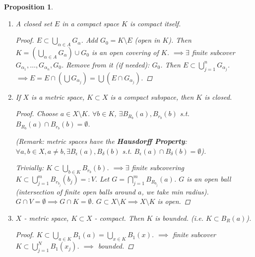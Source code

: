 \documentclass[12pt]{article}
\theoremstyle{blueplain}
\newtheorem{proposition}[theorem]{Proposition}
\theoremstyle{bluedef}
\theoremstyle{blueremark}
\numberwithin{equation}{section}
\begin{document}
      \begin{proposition}
        \begin{enumerate}
          \item A closed set $E$ in a compact space $K$ is compact itself.
                \begin{proof}
                  $E \subset \bigcup_{\alpha \in A} G_\alpha$. Add $G_0 = K \setminus E$ (open in $K$).
                  Then $K = (\bigcup_{\alpha \in A} G_\alpha) \cup G_0$ is an open covering of $K$.
                  $\implies \exists$ finite subcover $G_{\alpha_1}, \ldots, G_{\alpha_n}, G_0$.
                  Remove from it (if needed): $G_0$.
                  Then $E \subset \bigcup_{j=1}^n G_{\alpha_j}$.
                  $\implies E = E \cap (\bigcup G_{\alpha_j}) = \bigcup (E \cap G_{\alpha_j})$.
                \end{proof}
          \item If $X$ is a metric space, $K \subset X$ is a compact subspace, then $K$ is closed.
                \begin{proof}
                  Choose $a \in X \setminus K$. $\forall b \in K$, $\exists B_{R_b}(a), B_{r_b}(b)$ s.t. $B_{R_b}(a) \cap B_{r_b}(b) = \emptyset$.

                  (Remark: metric spaces have the \textbf{Hausdorff Property}: $\forall a, b \in X, a \neq b, \exists B_\epsilon(a), B_\delta(b)$ s.t. $B_\epsilon(a) \cap B_\delta(b) = \emptyset$).

                  Trivially: $K \subset \bigcup_{b \in K} B_{r_b}(b)$.
                  $\implies \exists$ finite subcovering $K \subset \bigcup_{j=1}^m B_{r_{b_j}}(b_j) =: V$.
                  Let $G = \bigcap_{j=1}^m B_{R_{b_j}}(a)$. $G$ is an open ball (intersection of finite open balls around $a$, we take min radius).
                  $G \cap V = \emptyset \implies G \cap K = \emptyset$.
                  $G \subset X \setminus K \implies X \setminus K$ is open.
                \end{proof}
          \item $X$ - metric space, $K \subset X$ - compact. Then $K$ is bounded. (i.e. $K \subset B_R(a)$).
                \begin{proof}
                  $K \subset \bigcup_{a \in K} B_1(a) = \bigcup_{x \in K} B_1(x)$.
                  $\implies$ finite subcover $K \subset \bigcup_{j=1}^N B_1(x_j)$.
                  $\implies$ bounded.
                \end{proof}
        \end{enumerate}
      \end{proposition}
\end{document}
